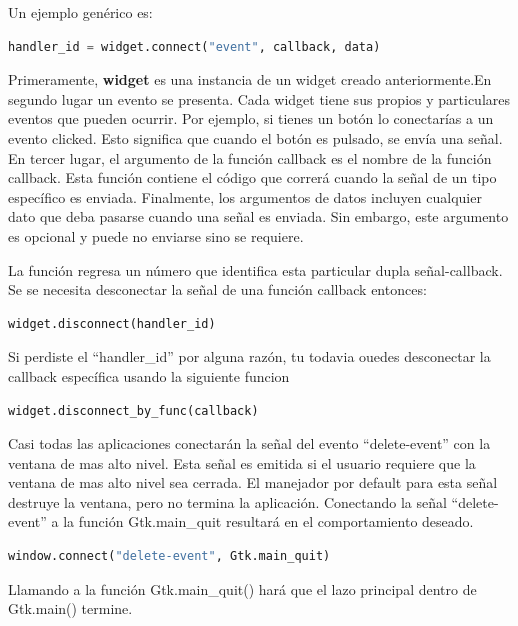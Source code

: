 \documentclass[12pt, twoside]{report}
\begin{document}
Un ejemplo genérico es:

\begin{lstlisting}[language=Python]
handler_id = widget.connect("event", callback, data)
\end{lstlisting}

Primeramente, \textbf{widget} es una instancia de un widget creado anteriormente.En segundo lugar un evento se presenta. Cada widget tiene sus propios y particulares eventos que pueden ocurrir. Por ejemplo, si tienes un botón lo conectarías a un evento clicked. Esto significa que cuando el botón es pulsado, se envía una señal. En tercer lugar, el argumento de la función callback es el nombre de la función callback. Esta función contiene el código que correrá cuando la señal de un tipo específico es enviada. Finalmente, los argumentos de datos incluyen cualquier dato que deba pasarse cuando una señal es enviada. Sin embargo, este argumento es opcional y puede no enviarse sino se requiere.

La función regresa un número que identifica esta particular dupla señal-callback. Se se necesita desconectar la señal de una función callback entonces:


\begin{lstlisting}[language=Python]
widget.disconnect(handler_id)
\end{lstlisting}


Si perdiste el ``handler\_id'' por alguna razón, tu todavia ouedes desconectar la callback específica usando la siguiente funcion

\begin{lstlisting}[language=Python]
widget.disconnect_by_func(callback)
\end{lstlisting}

Casi todas las aplicaciones conectarán la señal del evento ``delete-event'' con la ventana de mas alto nivel. Esta señal es emitida si el usuario requiere que la ventana de mas alto nivel sea cerrada. El manejador por default para esta señal destruye la ventana, pero no termina la aplicación. Conectando la señal ``delete-event'' a la función Gtk.main\_quit resultará en el comportamiento deseado. 


\begin{lstlisting}[language=Python]
window.connect("delete-event", Gtk.main_quit)
\end{lstlisting}

Llamando a la función Gtk.main\_quit() hará que el lazo principal dentro de Gtk.main() termine.
\end{document}
